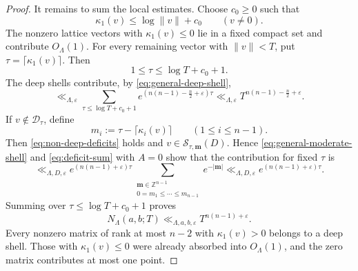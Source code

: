 \documentclass[reqno,11pt]{amsart}
\numberwithin{equation}{section}
\theoremstyle{definition}
\theoremstyle{remark}
\begin{document}
\begin{proof}
It remains to sum the local estimates. Choose $c_0\ge0$ such that
$$
\kappa_1(v)\le\log\|v\|+c_0
\qquad(v\ne0).
$$
The nonzero lattice vectors with $\kappa_1(v)\le0$ lie in a fixed
compact set and contribute $O_\Lambda(1)$. For every remaining vector
with $\|v\|<T$, put $\tau=\lceil\kappa_1(v)\rceil$. Then
$$
1\le\tau\le\log T+c_0+1.
$$
The deep shells contribute, by \eqref{eq:general-deep-shell},
$$
\ll_{\Lambda,\varepsilon}
\sum_{\tau\le\log T+c_0+1}e^{(n(n-1)-\frac n2+\varepsilon)\tau}
\ll_{\Lambda,\varepsilon}T^{n(n-1)-\frac n2+\varepsilon}.
$$
If $v\notin\mathcal D_\tau$, define
$$
m_i:=\tau-\lceil\kappa_i(v)\rceil
\qquad(1\le i\le n-1).
$$
Then \eqref{eq:non-deep-deficits} holds and
$v\in\mathcal S_{\tau,\mathbf m}(D)$. Hence
\eqref{eq:general-moderate-shell} and
\eqref{eq:deficit-sum} with $A=0$ show that the contribution for fixed
$\tau$ is
$$
\ll_{\Lambda,D,\varepsilon}
e^{(n(n-1)+\varepsilon)\tau}
\sum_{\substack{
\mathbf m\in\mathbb Z^{n-1}\\
0=m_1\le\cdots\le m_{n-1}}}
e^{-|\mathbf m|}
\ll_{\Lambda,D,\varepsilon}e^{(n(n-1)+\varepsilon)\tau}.
$$
Summing over $\tau\le\log T+c_0+1$ proves
\begin{equation}\label{eq:general-upper-unimodular}
N_\Lambda(a,b;T)
\ll_{\Lambda,a,b,\varepsilon}T^{n(n-1)+\varepsilon}.
\end{equation}
Every nonzero matrix of rank at most $n-2$ with $\kappa_1(v)>0$
belongs to a deep shell. Those with $\kappa_1(v)\le0$ were already
absorbed into $O_\Lambda(1)$, and the zero matrix contributes at
most one point.



\end{proof}
\end{document}
